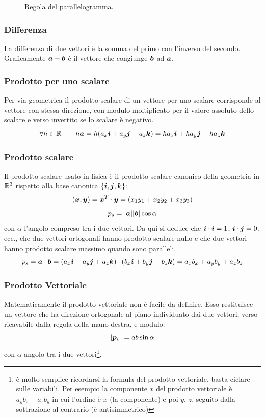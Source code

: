 \begin{figure}[htbp]
  \centering
  
  \caption{Regola del parallelogramma.}
\end{figure}

\subsubsection{Differenza} La differenza di due
vettori è la somma del primo con l'inverso del secondo. Graficamente $\boldsymbol{a}-\boldsymbol{b}$ è il vettore che congiunge $\boldsymbol{b}$ ad $\boldsymbol{a}$.
\subsubsection{Prodotto per uno scalare}
Per via geometrica il prodotto scalare di un vettore per uno scalare corrisponde al vettore con stessa direzione, con modulo moltiplicato per il valore assoluto dello scalare e verso invertito se lo scalare è negativo.
\[\forall h \in \mathbb{R}\qquad h\boldsymbol{a}=h(a_x\boldsymbol{i}+a_y\boldsymbol{j}+a_z\boldsymbol{k})=ha_x\boldsymbol{i}+ha_y\boldsymbol{j}+ha_z\boldsymbol{k}\]
\subsubsection{Prodotto scalare}
Il prodotto scalare usato in fisica è il prodotto scalare canonico della geometria in $\mathbb{R}^3$ rispetto alla base canonica $\{\boldsymbol{i},\boldsymbol{j},\boldsymbol{k}\}$:
\[\left(\boldsymbol{x},\boldsymbol{y}\right)=\boldsymbol{x}^T\cdot\boldsymbol{y}=(x_1y_1+x_2y_2+x_3y_3)\]
\[p_s=|\boldsymbol{a}||\boldsymbol{b}| \cos \alpha\]
con $\alpha$ l'angolo compreso tra i due vettori. Da qui si deduce che $\boldsymbol{i} \cdot \boldsymbol{i}=1$, $\boldsymbol{i}
  \cdot \boldsymbol{j}=0$, ecc., che due vettori ortogonali hanno prodotto scalare nullo e che due vettori hanno prodotto scalare massimo quando sono paralleli.
\[p_s=\boldsymbol{a} \cdot \boldsymbol{b}=(a_x\boldsymbol{i}+a_y\boldsymbol{j}+a_z\boldsymbol{k})\cdot(b_x\boldsymbol{i}+b_y\boldsymbol{j}+b_z\boldsymbol{k})=a_xb_x+a_yb_y+a_zb_z\]
\subsubsection{Prodotto Vettoriale}
Matematicamente il prodotto vettoriale non è facile da definire. Esso restituisce un vettore che ha direzione ortogonale al piano individuato dai due vettori, verso ricavabile dalla regola della mano destra, e modulo:
\[|\boldsymbol{p}_v|=ab\sin \alpha\] con $\alpha$ angolo tra i due vettori\footnote{è molto semplice ricordarsi la formula del prodotto vettoriale, basta ciclare sulle variabili. Per esempio la componente $x$ del prodotto vettoriale è $a_yb_z-a_zb_y$ in cui l'ordine è $x$ (la componente) e poi $y$, $z$, seguito dalla sottrazione al contrario (è antisimmetrico)}.


